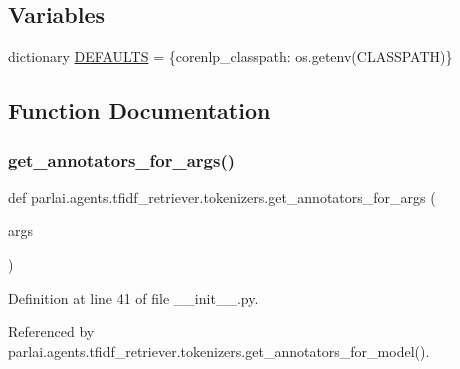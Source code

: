 \subsection*{Variables}
\begin{DoxyCompactItemize}
\item 
dictionary \hyperlink{namespaceparlai_1_1agents_1_1tfidf__retriever_1_1tokenizers_aceb8da08449faf55b676b50a2c09a291}{D\+E\+F\+A\+U\+L\+TS} = \{\textquotesingle{}corenlp\+\_\+classpath\textquotesingle{}\+: os.\+getenv(\textquotesingle{}C\+L\+A\+S\+S\+P\+A\+TH\textquotesingle{})\}
\end{DoxyCompactItemize}


\subsection{Function Documentation}
\mbox{\label{namespaceparlai_1_1agents_1_1tfidf__retriever_1_1tokenizers_abbf344e2c42997de73bbe499f86cdba7}} 
\subsubsection{\texorpdfstring{get\+\_\+annotators\+\_\+for\+\_\+args()}{get\_annotators\_for\_args()}}
{\footnotesize\ttfamily def parlai.\+agents.\+tfidf\+\_\+retriever.\+tokenizers.\+get\+\_\+annotators\+\_\+for\+\_\+args (\begin{DoxyParamCaption}\item[{}]{args }\end{DoxyParamCaption})}



Definition at line 41 of file \+\_\+\+\_\+init\+\_\+\+\_\+.\+py.



Referenced by parlai.\+agents.\+tfidf\+\_\+retriever.\+tokenizers.\+get\+\_\+annotators\+\_\+for\+\_\+model().

